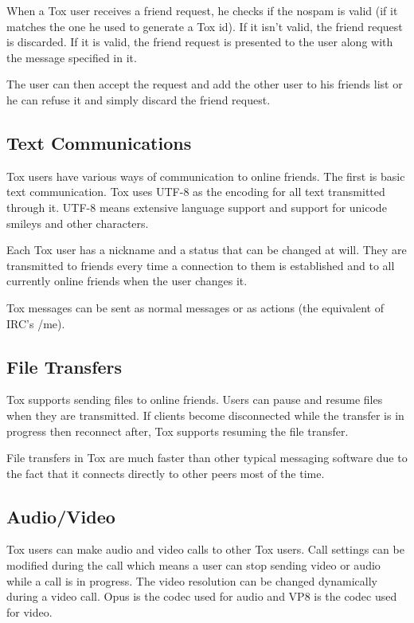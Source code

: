 \documentclass{tox}
\begin{document}
When a Tox user receives a friend request, he checks if the nospam is valid (if 
it matches the one he used to generate a Tox id). If it isn't valid, the friend 
request is discarded. If it is valid, the friend request is presented to the 
user along with the message specified in it.

The user can then accept the request and add the other user to his friends list 
or he can refuse it and simply discard the friend request.

\subsection{Text Communications}

Tox users have various ways of communication to online friends. The first is 
basic text communication. Tox uses UTF-8 as the encoding for all text 
transmitted through it. UTF-8 means extensive language support and support for 
unicode smileys and other characters.

Each Tox user has a nickname and a status that can be changed at will. They are 
transmitted to friends every time a connection to them is established and to 
all currently online friends when the user changes it.

Tox messages can be sent as normal messages or as actions (the equivalent of 
IRC's /me).

\subsection{File Transfers}

Tox supports sending files to online friends. Users can pause and resume files 
when they are transmitted. If clients become disconnected while the transfer is 
in progress then reconnect after, Tox supports resuming the file transfer.

File transfers in Tox are much faster than other typical messaging software due 
to the fact that it connects directly to other peers most of the time.

\subsection{Audio/Video}

Tox users can make audio and video calls to other Tox users. Call settings can 
be modified during the call which means a user can stop sending video or audio 
while a call is in progress. The video resolution can be changed dynamically 
during a video call. Opus is the codec used for audio and VP8 is the codec used 
for video.
\end{document}
